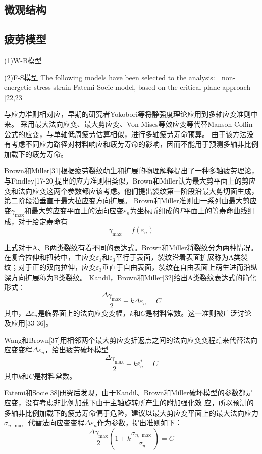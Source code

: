 \documentclass{article}
\begin{document}
\subsection{微观结构}

\subsection{疲劳模型}
(1)W-B模型


(2)F-S模型
The following models have been selected to the analysis:
 non-energetic stress-strain Fatemi-Socie model, based on the critical plane approach [22,23]

与应力准则相对应，早期的研究者Yokobori等将静强度理论应用到多轴应变准则中来。
采用最大法向应变、最大剪应变、Von Mises等效应变等代替Manson-Coffin公式的应变，与单轴低周疲劳估算相似，进行多轴疲劳寿命预算。
由于该方法没有考虑不同应力路径对材料响应和疲劳寿命的影响，因而不能用于预测多轴非比例加载下的疲劳寿命。

Brown和Miller[31]根据疲劳裂纹萌生和扩展的物理解释提出了一种多轴疲劳理论，与Findley[17-20]提出的应力准则相类似，Brown和Miller认为最大剪平面上的剪应变和法向应变这两个参数都应该考虑。他们提出裂纹第一阶段沿最大剪切面生成，第二阶段沿垂直于最大拉应变方向扩展。
Brown和Miller准则由一系列由最大剪应变${\gamma _{\max }}$和最大剪应变平面上的法向应变${\varepsilon _n}$为坐标所组成的$\Gamma$平面上的等寿命曲线组成，对于给定寿命有
\[{\gamma _{\max }} = f\left( {{\varepsilon _n}} \right)\]

上式对于A、B两类裂纹有着不同的表达式。Brown和Miller将裂纹分为两种情况。在复合拉伸和扭转中，主应变${\varepsilon _1}$和${\varepsilon _3}$平行于表面，裂纹沿着表面扩展称为A类裂纹；对于正的双向拉伸，应变${\varepsilon _3}$垂直于自由表面，裂纹在自由表面上萌生进而沿纵深方向扩展称为B类裂纹。
Kandil，Brown和Miller[32]给出A类裂纹表达式的简化形式：
\[\frac{{\Delta {\gamma _{\max }}}}{2} + k\Delta {\varepsilon _n} = C\]
其中，$\Delta {\varepsilon _n}$是临界面上的法向应变变幅，$k$和$C$是材料常数。这一准则被广泛讨论及应用[33-36]。

Wang和Brown[37]用相邻两个最大剪应变折返点之间的法向应变变程${\varepsilon _n^*}$来代替法向应变变程$\Delta {\varepsilon _n}$，给出疲劳破坏模型
\[\frac{{\Delta {\gamma _{\max }}}}{2} + k\varepsilon _n^* = C\]
其中$k$和$C$是材料常数。

Fatemi和Socie[38]研究后发现，由于Kandil、Brown和Miller破坏模型的参数都是应变，没有考虑非比例加载下由于主轴旋转所产生的附加强化效
应，所以预测的多轴非比例加载下的疲劳寿命偏于危险，建议以最大剪应变平面上的最大法向应力${\sigma _{n,\max }}$
代替法向应变变程$\Delta {\varepsilon _n}$作为参数，提出准则如下：
\[\frac{{\Delta {\gamma _{\max }}}}{2}\left( {1 + k\frac{{{\sigma _{n,\max }}}}{{{\sigma _y}}}} \right) = C\]
\end{document}
